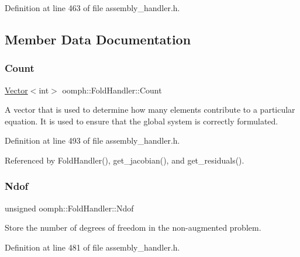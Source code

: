 Definition at line 463 of file assembly\+\_\+handler.\+h.



\subsection{Member Data Documentation}
\mbox{\label{classoomph_1_1FoldHandler_a302fed88ed8dad865616a3d050d385ad}} 
\subsubsection{\texorpdfstring{Count}{Count}}
{\footnotesize\ttfamily \hyperlink{classoomph_1_1Vector}{Vector}$<$int$>$ oomph\+::\+Fold\+Handler\+::\+Count\hspace{0.3cm}{\ttfamily [private]}}



A vector that is used to determine how many elements contribute to a particular equation. It is used to ensure that the global system is correctly formulated. 



Definition at line 493 of file assembly\+\_\+handler.\+h.



Referenced by Fold\+Handler(), get\+\_\+jacobian(), and get\+\_\+residuals().

\mbox{\label{classoomph_1_1FoldHandler_aa3f143846245ecea5967ba7c79bedf56}} 
\subsubsection{\texorpdfstring{Ndof}{Ndof}}
{\footnotesize\ttfamily unsigned oomph\+::\+Fold\+Handler\+::\+Ndof\hspace{0.3cm}{\ttfamily [private]}}



Store the number of degrees of freedom in the non-\/augmented problem. 



Definition at line 481 of file assembly\+\_\+handler.\+h.



